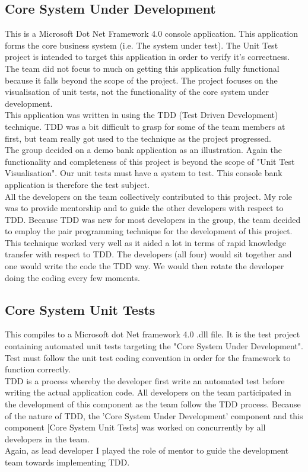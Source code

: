 \documentclass[a4paper,12pt]{article}
\begin{document}
\subsection{Core System Under Development}
This is a Microsoft Dot Net Framework 4.0\cite{dotNetFramework} console application. This application forms the core business system (i.e. The system under test). The Unit Test project is intended to target this application in order to verify it's correctness. The team did not focus to much on getting this application fully functional because it falls beyond the scope of the project. The project focuses on the visualisation of unit tests, not the functionality of the core system under development.\\
\linebreak
This application was written in using the TDD (Test Driven Development\cite{tdd}) technique. TDD was a bit difficult to grasp for some of the team members at first, but team really got used to the technique as the project progressed.\\
\linebreak
The group decided on a demo bank application as an illustration. Again the functionality and completeness of this project is beyond the scope of "Unit Test Visualisation". Our unit tests must have a system to test. This console bank application is therefore the test subject.\\
\linebreak
All the developers on the team collectively contributed to this project. My role was to provide mentorship and to guide the other developers with respect to TDD. Because TDD was new for most developers in the group, the team decided to employ the pair programming\cite{pairprogramming} technique for the development of this project. This technique worked very well as it aided a lot in terms of rapid knowledge transfer with respect to TDD. The developers (all four) would sit together and one would write the code the TDD way. We would then rotate the developer doing the coding every few moments.

\subsection{Core System Unit Tests}
This compiles to a Microsoft dot Net framework 4.0\cite{dotNetFramework} .dll file. It is the test project containing automated unit tests targeting the "Core System Under Development". Test must follow the unit test coding convention\cite{codeconvention} in order for the framework to function correctly.\\
\linebreak
TDD is a process whereby the developer first write an automated test before writing the actual application code. All developers on the team participated in the development of this component as the team follow the TDD process. Because of the nature of TDD, the 'Core System Under Development' component and this component [Core System Unit Tests] was worked on concurrently by all developers in the team.\\
\linebreak
Again, as lead developer I played the role of mentor to guide the development team towards implementing TDD. 
\end{document}
